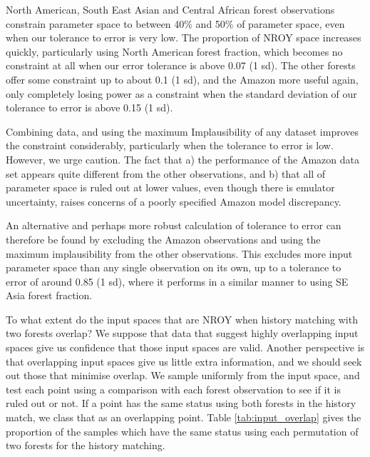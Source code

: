 \documentclass[esd, manuscript]{copernicus}
\begin{document}
North American, South East Asian and Central African forest observations constrain parameter space to between 40\% and 50\% of parameter space, even when our tolerance to error is very low. The proportion of NROY space increases quickly, particularly using North American forest fraction, which becomes no constraint at all when our error tolerance is above 0.07 (1 sd). The other forests offer some constraint up to about 0.1 (1 sd), and the Amazon more useful again, only completely losing power as a constraint when the standard deviation of our tolerance to error is above 0.15 (1 sd).

Combining data, and using the maximum Implausibility of any dataset improves the constraint considerably, particularly when the tolerance to error is low. However, we urge caution. The fact that a) the performance of the Amazon data set appears quite different from the other observations, and b) that all of parameter space is ruled out at lower values, even though there is emulator uncertainty, raises concerns of a poorly specified Amazon model discrepancy. 

An alternative and perhaps more robust calculation of tolerance to error can therefore be found by excluding the Amazon observations and using the maximum implausibility from the other observations. This excludes more input parameter space than any single observation on its own, up to a tolerance to error of around 0.85 (1 sd), where it performs in a similar manner to using SE Asia forest fraction.
 

To what extent do the input spaces that are NROY when history matching with two forests overlap? We suppose that data that suggest highly overlapping input spaces give us confidence that those input spaces are valid. Another perspective is that overlapping input spaces give us little extra information, and we should seek out those that minimise overlap. We sample uniformly from the input space, and test each point using a comparison with each forest observation to see if it is ruled out or not. If a point has the same status using both forests in the history match, we class that as an overlapping point. Table \ref{tab:input_overlap} gives the proportion of the samples which have the same status using each permutation of two forests for the history matching.
\end{document}

